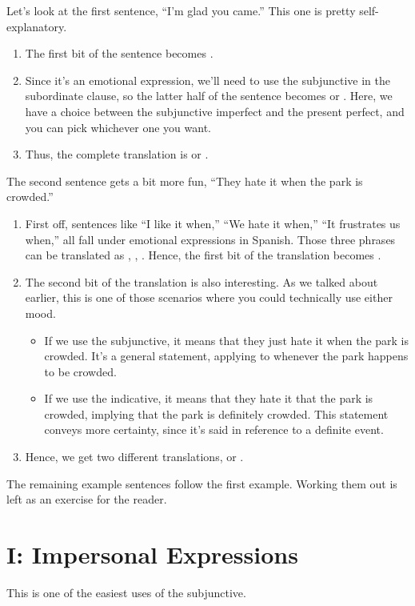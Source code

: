 Let's look at the first sentence, ``I'm glad you came.'' This one is pretty self-explanatory. 
\begin{enumerate}
	\item The first bit of the sentence becomes . 
	\item Since it's an emotional expression, we'll need to use the subjunctive in the subordinate clause, so the latter half of the sentence becomes  or . Here, we have a choice between the subjunctive imperfect and the present perfect, and you can pick whichever one you want. 
	\item Thus, the complete translation is  or .
\end{enumerate}

The second sentence gets a bit more fun, ``They hate it when the park is crowded.''
\begin{enumerate}
	\item First off, sentences like ``I like it when,'' ``We hate it when,'' ``It frustrates us when,'' all fall under emotional expressions in Spanish. Those three phrases can be translated as , , . Hence, the first bit of the translation becomes .
	\item The second bit of the translation is also interesting. As we talked about earlier, this is one of those scenarios where you could technically use either mood. 
		\begin{itemize}
			\item If we use the subjunctive, it means that they just hate it when the park is crowded. It's a general statement, applying to whenever the park happens to be crowded. 
			\item If we use the indicative, it means that they hate it that the park is crowded, implying that the park is definitely crowded. This statement conveys more certainty, since it's said in reference to a definite event. 
		\end{itemize}
	\item Hence, we get two different translations,  or . 
\end{enumerate}

The remaining example sentences follow the first example. Working them out is left as an exercise for the reader. 
\section{I: Impersonal Expressions}
This is one of the easiest uses of the subjunctive. \\

